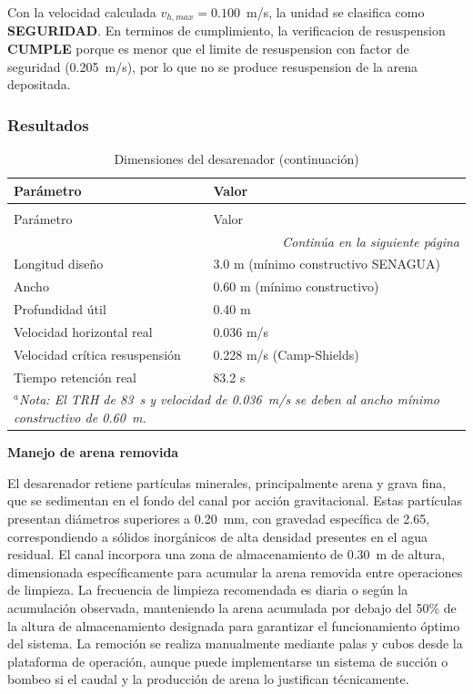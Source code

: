 \documentclass[12pt,a4paper]{article}
\begin{document}
Con la velocidad calculada $v_{h,max} = 0.100$~m/s, la unidad se clasifica como \textbf{SEGURIDAD}. En terminos de cumplimiento, la verificacion de resuspension \textbf{CUMPLE} porque es menor que el limite de resuspension con factor de seguridad (0.205~m/s), por lo que no se produce resuspension de la arena depositada.

\subsubsection{Resultados}

\begingroup
\small
\begin{longtable}{l p{9cm}}
\caption{Dimensiones del desarenador}\\
\toprule
Par\'ametro & Valor \\
\midrule
\endfirsthead
\caption[]{Dimensiones del desarenador (continuación)}\\
\toprule
Par\'ametro & Valor \\
\midrule
\endhead
\midrule
\multicolumn{2}{r}{\textit{Continúa en la siguiente página}} \\
\endfoot
\bottomrule
\endlastfoot
Longitud dise\~no & 3.0 m (m\'inimo constructivo SENAGUA) \\
Ancho & 0.60 m (m\'inimo constructivo) \\
Profundidad \'util & 0.40 m \\
Velocidad horizontal real & 0.036 m/s \\
Velocidad cr\'itica resuspensi\'on & 0.228 m/s (Camp-Shields) \\
Tiempo retenci\'on real & 83.2 s \\
\multicolumn{2}{p{\textwidth}}{\small\textit{$^a$Nota: El TRH de 83~s y velocidad de 0.036~m/s se deben al ancho m\'inimo constructivo de 0.60~m. }} \\
\end{longtable}
\endgroup

\textbf{Manejo de arena removida}

El desarenador retiene part\'iculas minerales, principalmente arena y grava fina, que se sedimentan en el fondo del canal por acci\'on gravitacional. Estas part\'iculas presentan di\'ametros superiores a 0.20~mm, con gravedad espec\'ifica de 2.65, correspondiendo a s\'olidos inorg\'anicos de alta densidad presentes en el agua residual. El canal incorpora una zona de almacenamiento de 0.30~m de altura, dimensionada espec\'ificamente para acumular la arena removida entre operaciones de limpieza. La frecuencia de limpieza recomendada es diaria o seg\'un la acumulaci\'on observada, manteniendo la arena acumulada por debajo del 50\% de la altura de almacenamiento designada para garantizar el funcionamiento \'optimo del sistema. La remoci\'on se realiza manualmente mediante palas y cubos desde la plataforma de operaci\'on, aunque puede implementarse un sistema de succi\'on o bombeo si el caudal y la producci\'on de arena lo justifican t\'ecnicamente.
\end{document}

